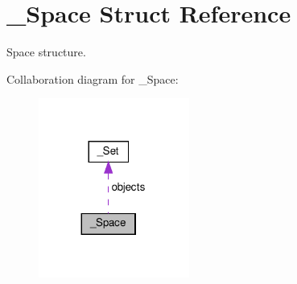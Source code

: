 \hypertarget{struct__Space}{}\section{\+\_\+\+Space Struct Reference}
\label{struct__Space}


Space structure.  




Collaboration diagram for \+\_\+\+Space\+:\nopagebreak
\begin{figure}[H]
\begin{center}
\leavevmode
\includegraphics[width=140pt]{struct__Space__coll__graph}
\end{center}
\end{figure}
